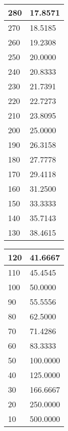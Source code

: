\begin{table}[H]
\begin{tabularx}{\textwidth}{|X|X|}
		280  & 17.8571         \\ \hline
		270  & 18.5185         \\ \hline
		260  & 19.2308         \\ \hline
		250  & 20.0000         \\ \hline
		240  & 20.8333         \\ \hline
		230  & 21.7391         \\ \hline
		220  & 22.7273         \\ \hline
		210  & 23.8095         \\ \hline
		200  & 25.0000         \\ \hline
		190  & 26.3158         \\ \hline
		180  & 27.7778         \\ \hline
		170  & 29.4118         \\ \hline
		160  & 31.2500         \\ \hline
		150  & 33.3333         \\ \hline
		140  & 35.7143         \\ \hline
		130  & 38.4615         \\ \hline
	\end{tabularx}
\end{table}

\begin{table}[H]
	\centering
	\begin{tabularx}{\textwidth}{|X|X|}
		\hline
		120  & 41.6667         \\ \hline
		110  & 45.4545         \\ \hline
		100  & 50.0000         \\ \hline
		90   & 55.5556         \\ \hline
		80   & 62.5000         \\ \hline
		70   & 71.4286         \\ \hline
		60   & 83.3333         \\ \hline
		50   & 100.0000        \\ \hline
		40   & 125.0000        \\ \hline
		30   & 166.6667        \\ \hline
		20   & 250.0000        \\ \hline
		10   & 500.0000        \\ \hline
	\end{tabularx}
\end{table}

\newpage

